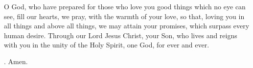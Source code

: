 \lettrine[lines=3]{O}{} God, who have prepared for those who love you 
good things which no eye can see,
fill our hearts, we pray, with the warmth of your love,
so that, loving you in all things and above all things,
we may attain your promises,
which surpass every human desire.
Through our Lord Jesus Christ, your Son,
who lives and reigns with you in the unity of the Holy Spirit,
one God, for ever and ever. \par \Rbar. Amen.
